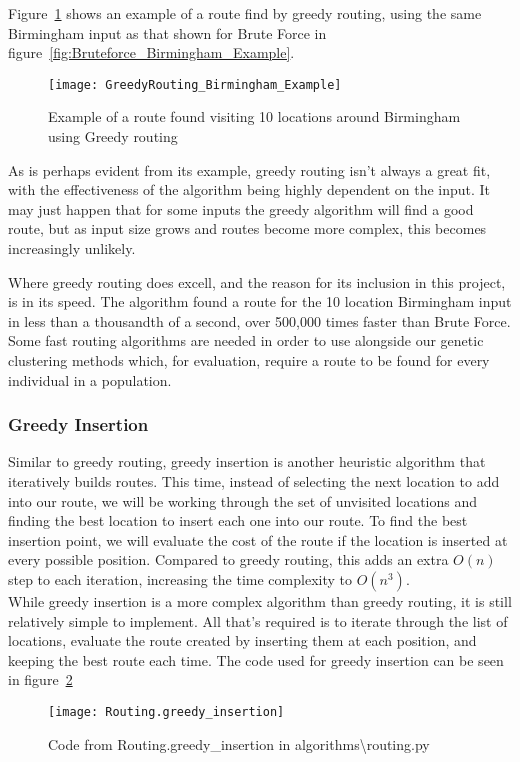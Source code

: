 \noindent
Figure~\ref{fig:GreedyRouting_Birmingham_Example} shows an example of a route find by greedy routing, using the same
Birmingham input as that shown for Brute Force in figure~\ref{fig:Bruteforce_Birmingham_Example}.
\begin{figure}[H]
    \centering
    \texttt{[image: GreedyRouting\_Birmingham\_Example]}
    \caption{Example of a route found visiting 10 locations around Birmingham using Greedy routing}
    \label{fig:GreedyRouting_Birmingham_Example}
\end{figure}

\noindent
As is perhaps evident from its example, greedy routing isn't always a great fit, with the effectiveness of the
algorithm being highly dependent on the input.
It may just happen that for some inputs the greedy algorithm will find a good route, but as input size grows and
routes become more complex, this becomes increasingly unlikely.

Where greedy routing does excell, and the reason for its inclusion in this project, is in its speed.
The algorithm found a route for the 10 location Birmingham input in less than a thousandth of a second, over 500,000
times faster than Brute Force.
Some fast routing algorithms are needed in order to use alongside our genetic clustering methods which, for
evaluation, require a route to be found for every individual in a population.

\subsubsection{Greedy Insertion}\label{subsubsec:greedy-insertion}
Similar to greedy routing, greedy insertion is another heuristic algorithm that iteratively builds routes.
This time, instead of selecting the next location to add into our route, we will be working through the set of
unvisited locations and finding the best location to insert each one into our route.
To find the best insertion point, we will evaluate the cost of the route if the location is inserted at every possible
position.
Compared to greedy routing, this adds an extra $O(n)$ step to each iteration, increasing the time complexity to
$O(n^3)$.\\

\noindent
While greedy insertion is a more complex algorithm than greedy routing, it is still relatively simple to implement.
All that's required is to iterate through the list of locations, evaluate the route created by inserting them at
each position, and keeping the best route each time.
The code used for greedy insertion can be seen in figure~\ref{fig:Routing.greedy_insertion}
\begin{figure}[H]
    \centering
    \texttt{[image: Routing.greedy\_insertion]}
    \caption{Code from Routing.greedy\_insertion in algorithms\textbackslash routing.py}
    \label{fig:Routing.greedy_insertion}
\end{figure}

